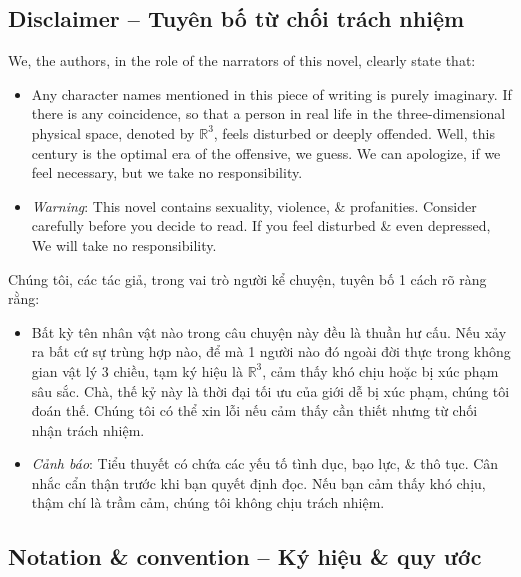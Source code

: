 \documentclass[12pt]{article}
\begin{document}
\subsection{Disclaimer -- Tuyên bố từ chối trách nhiệm}
We, the authors, in the role of the narrators of this novel, clearly state that:
\begin{itemize}
	\item Any character names mentioned in this piece of writing is purely imaginary. If there is any coincidence, so that a person in real life in the three-dimensional physical space, denoted by $\mathbb{R}^3$, feels disturbed or deeply offended. Well, this century is the optimal era of the offensive, we guess. We can apologize, if we feel necessary, but we take no responsibility.
	\item {\it Warning}: This novel contains sexuality, violence, \& profanities. Consider carefully before you decide to read. If you feel disturbed \& even depressed, We will take no responsibility.
\end{itemize}
Chúng tôi, các tác giả, trong vai trò người kể chuyện, tuyên bố 1 cách rõ ràng rằng:
\begin{itemize}
	\item Bất kỳ tên nhân vật nào trong câu chuyện này đều là thuần hư cấu. Nếu xảy ra bất cứ sự trùng hợp nào, để mà 1 người nào đó ngoài đời thực trong không gian vật lý 3 chiều, tạm ký hiệu là $\mathbb{R}^3$, cảm thấy khó chịu hoặc bị xúc phạm sâu sắc. Chà, thế kỷ này là thời đại tối ưu của giới dễ bị xúc phạm, chúng tôi đoán thế. Chúng tôi có thể xin lỗi nếu cảm thấy cần thiết nhưng từ chối nhận trách nhiệm.
	\item {\it Cảnh báo}: Tiểu thuyết có chứa các yếu tố tình dục, bạo lực, \& thô tục. Cân nhắc cẩn thận trước khi bạn quyết định đọc. Nếu bạn cảm thấy khó chịu, thậm chí là trầm cảm, chúng tôi không chịu trách nhiệm.
\end{itemize}

\subsection{Notation \& convention -- Ký hiệu \& quy ước}
\end{document}
